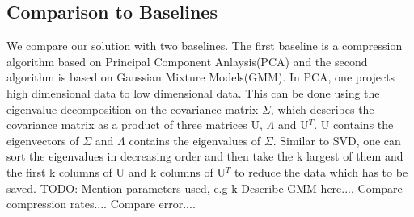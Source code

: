 \subsection{Comparison to Baselines}
We compare our solution with two baselines. The first baseline is a compression algorithm based on Principal Component Anlaysis(PCA) and the second algorithm is based on Gaussian Mixture Models(GMM).  
\newline
In PCA, one projects high dimensional data to low dimensional data. This can be done using the eigenvalue decomposition on the covariance matrix $\Sigma$, which describes the covariance matrix as a product of three matrices U, $\Lambda$ and U$^T$. U contains the eigenvectors of  $\Sigma$ and $\Lambda$ contains the eigenvalues of $\Sigma$. Similar to SVD, one can sort the eigenvalues in decreasing order and then take the k largest of them and the first k columns of U and k columns of U$^T$ to reduce the data which has to be saved. 
\newline
TODO: Mention parameters used, e.g k
\newline
Describe GMM here.... 
\newline
Compare compression rates.... 
\newline
Compare error....
